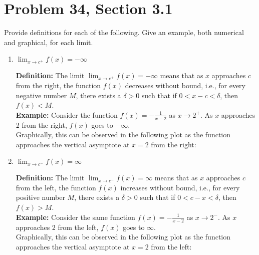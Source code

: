 \documentclass[12pt]{article}
\begin{document}
  \section*{Problem 34, Section 3.1}
  Provide definitions for each of the following. Give an example, both numerical and graphical, for each limit.
  \begin{enumerate}[label=(\alph*)]
    \item $\lim_{x \to c^+}f(x) = -\infty$
    
      \textbf{Definition:} The limit $\lim_{x \to c^+}f(x) = -\infty$ means that as $x$ approaches $c$ from the right, the function $f(x)$ decreases without bound, i.e., for every negative number $M$, there exists a $\delta > 0$ such that if $0 < x - c < \delta$, then $f(x) < M$.
      \\
      \textbf{Example:} Consider the function $f(x) = -\frac{1}{x - 2}$ as $x \to 2^+$. As $x$ approaches 2 from the right, $f(x)$ goes to $-\infty$.
      \\
      Graphically, this can be observed in the following plot as the function approaches the vertical asymptote at $x = 2$ from the right:
      

    \item $\lim_{x \to c^-}f(x) = \infty$
    
      \textbf{Definition:} The limit $\lim_{x \to c^-}f(x) = \infty$ means that as $x$ approaches $c$ from the left, the function $f(x)$ increases without bound, i.e., for every positive number $M$, there exists a $\delta > 0$ such that if $0 < c - x < \delta$, then $f(x) > M$.
      \\
      \textbf{Example:} Consider the same function $f(x) = -\frac{1}{x - 2}$ as $x \to 2^-$. As $x$ approaches 2 from the left, $f(x)$ goes to $\infty$.
      \\
      Graphically, this can be observed in the following plot as the function approaches the vertical asymptote at $x = 2$ from the left:
      

\end{enumerate}
\end{document}
